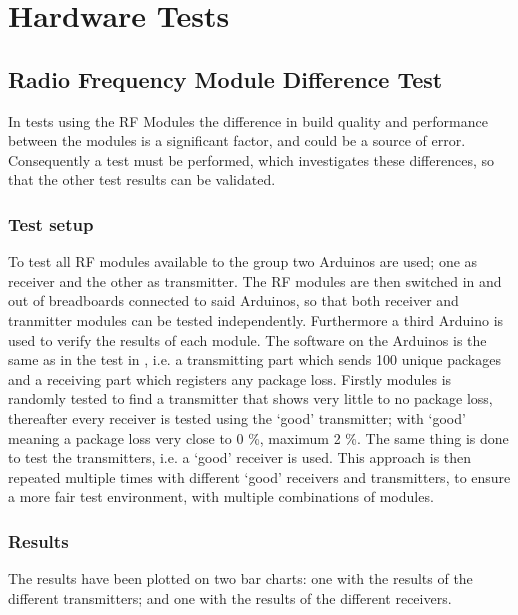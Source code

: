 \chapter{Hardware Tests}
\section{Radio Frequency Module Difference Test}\label{sec:RFMD}
In tests using the RF Modules the difference in build quality and performance between the modules is a significant factor, and could be a source of error.
Consequently a test must be performed, which investigates these differences, so that the other test results can be validated.

\subsection{Test setup}
To test all RF modules available to the group two Arduinos are used; one as receiver and the other as transmitter.
The RF modules are then switched in and out of breadboards connected to said Arduinos, so that both receiver and tranmitter modules can be tested independently.
Furthermore a third Arduino is used to verify the results of each module.
The software on the Arduinos is the same as in the test in , i.e. a transmitting part which sends 100 unique packages and a receiving part which registers any package loss. 
Firstly modules is randomly tested to find a transmitter that shows very little to no package loss, thereafter every receiver is tested using the \enquote*{good} transmitter; with \enquote*{good} meaning a package loss very close to 0 \%, maximum 2 \%.
The same thing is done to test the transmitters, i.e. a \enquote*{good} receiver is used.
This approach is then repeated multiple times with different \enquote*{good} receivers and transmitters, to ensure a more fair test environment, with multiple combinations of modules.

\subsection{Results}
The results have been plotted on two bar charts: one with the results of the different transmitters; 
and one with the results of the different receivers.

